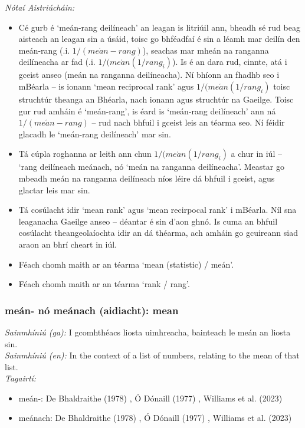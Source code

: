  \noindent \textit{Nótaí Aistriúcháin:}
\begin{itemize}
	\item Cé gurb é `meán-rang deilíneach' an leagan is litriúil ann, bheadh sé rud beag aisteach an leagan sin a úsáid, toisc go bhféadfaí é sin a léamh mar deilín den meán-rang (.i. $1 / (me\acute{a}n-rang)$), seachas mar mheán na ranganna deilíneacha ar fad (.i. $1 / (me\acute{a}n(1 / rang_i)$). Is é an dara rud, cinnte, atá i gceist anseo (meán na ranganna deilíneacha). Ní bhíonn an fhadhb seo i mBéarla -- is ionann `mean reciprocal rank' agus $1 / (me\acute{a}n(1 / rang_i)$ toisc struchtúr theanga an Bhéarla, nach ionann agus struchtúr na Gaeilge. Toisc gur rud amháin é `meán-rang', is éard is `meán-rang deilíneach' ann ná $1 / (me\acute{a}n-rang)$ -- rud nach bhfuil i gceist leis an téarma seo. Ní féidir glacadh le `meán-rang deilíneach' mar sin.
	\item Tá cúpla roghanna ar leith ann chun $1 / (me\acute{a}n(1 / rang_i)$ a chur in iúl -- `rang deilíneach meánach, nó `meán na ranganna deilíneacha'. Meastar go mbeadh meán na ranganna deilíneach níos léire dá bhfuil i gceist, agus glactar leis mar sin.
	\item Tá cosúlacht idir `mean rank' agus `mean recirpocal rank' i mBéarla. Níl sna leaganacha Gaeilge anseo -- déantar é sin d'aon ghnó. Is cuma an bhfuil cosúlacht theangeolaíochta idir an dá théarma, ach amháin go gcuireann siad araon an bhrí cheart in iúl.
	\item Féach chomh maith ar an téarma `mean (statistic) / meán'.
	\item Féach chomh maith ar an téarma `rank / rang'.
\end{itemize}


\subsubsection*{meán- nó meánach (aidiacht): mean}
 \noindent \textit{Sainmhíniú (ga):} I gcomhthéacs liosta uimhreacha, bainteach le meán an liosta sin.
\\
 \noindent \textit{Sainmhíniú (en):} In the context of a list of numbers, relating to the mean of that list.
\\
 \noindent \textit{Tagairtí:}
\begin{itemize}
	\item meán-: De Bhaldraithe (1978) \cite{de-bhaldraithe}, Ó Dónaill (1977) \cite{odonaill}, Williams et al. (2023) \cite{storchiste}
	\item meánach: De Bhaldraithe (1978) \cite{de-bhaldraithe}, Ó Dónaill (1977) \cite{odonaill}, Williams et al. (2023) \cite{storchiste}
\end{itemize}

